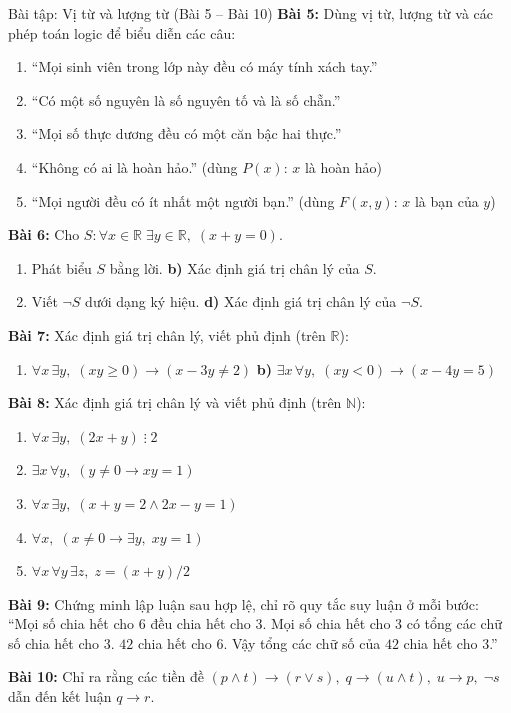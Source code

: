 \documentclass[12pt,a4paper]{article}
\begin{document}
\begin{baitap}{Bài tập: Vị từ và lượng từ (Bài 5 -- Bài 10)}
\textbf{Bài 5:} Dùng vị từ, lượng từ và các phép toán logic để biểu diễn các câu:
\begin{enumerate}[label=\textbf{\alph*)}, itemsep=1pt]
  \item ``Mọi sinh viên trong lớp này đều có máy tính xách tay.''
  \item ``Có một số nguyên là số nguyên tố và là số chẵn.''
  \item ``Mọi số thực dương đều có một căn bậc hai thực.''
  \item ``Không có ai là hoàn hảo.'' (dùng $P(x)$: $x$ là hoàn hảo)
  \item ``Mọi người đều có ít nhất một người bạn.'' (dùng $F(x, y)$: $x$ là bạn của $y$)
\end{enumerate}

\textbf{Bài 6:} Cho $S : \forall x \in \mathbb{R}\;\exists y \in \mathbb{R},\; (x + y = 0)$.
\begin{enumerate}[label=\textbf{\alph*)}, itemsep=1pt]
  \item Phát biểu $S$ bằng lời. \qquad
  \textbf{b)} Xác định giá trị chân lý của $S$.
  \item[\textbf{c)}] Viết $\neg S$ dưới dạng ký hiệu. \qquad
  \textbf{d)} Xác định giá trị chân lý của $\neg S$.
\end{enumerate}

\textbf{Bài 7:} Xác định giá trị chân lý, viết phủ định (trên $\mathbb{R}$):
\begin{enumerate}[label=\textbf{\alph*)}, itemsep=1pt]
  \item $\forall x\,\exists y,\; (xy \ge 0) \to (x - 3y \neq 2)$ \qquad
  \textbf{b)} $\exists x\,\forall y,\; (xy < 0) \to (x - 4y = 5)$
\end{enumerate}

\textbf{Bài 8:} Xác định giá trị chân lý và viết phủ định (trên $\mathbb{N}$):
\begin{enumerate}[label=\textbf{\alph*)}, itemsep=1pt]
  \item $\forall x\,\exists y,\; (2x + y) \mathrel{\vdots} 2$
  \item $\exists x\,\forall y,\; (y \neq 0 \to xy = 1)$
  \item $\forall x\,\exists y,\; (x + y = 2 \land 2x - y = 1)$
  \item $\forall x,\; (x \neq 0 \to \exists y,\; xy = 1)$
  \item $\forall x\,\forall y\,\exists z,\; z = (x + y)/2$
\end{enumerate}

\textbf{Bài 9:} Chứng minh lập luận sau hợp lệ, chỉ rõ quy tắc suy luận ở mỗi bước:\\
``Mọi số chia hết cho $6$ đều chia hết cho $3$. Mọi số chia hết cho $3$ có tổng các chữ số chia hết cho $3$. $42$ chia hết cho $6$. Vậy tổng các chữ số của $42$ chia hết cho $3$.''

\textbf{Bài 10:} Chỉ ra rằng các tiền đề $(p \land t) \to (r \lor s),\; q \to (u \land t),\; u \to p,\; \neg s$ dẫn đến kết luận $q \to r$.
\end{baitap}
\end{document}
